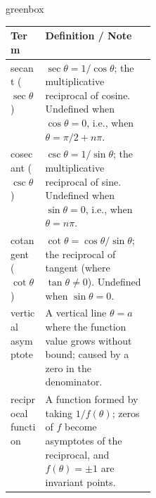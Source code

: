 \documentclass[10pt]{article}
\begin{document}
\begin{skillbox}{greenbox}
\begin{tabularx}{\linewidth}{@{} p{0.24\linewidth} X @{}}
\textbf{Term} & \textbf{Definition / Note} \\
\midrule
secant ($\sec\theta$) &
  $\sec\theta = 1/\cos\theta$; the multiplicative reciprocal of cosine.
  Undefined when $\cos\theta = 0$, i.e., when $\theta = \pi/2 + n\pi$. \\[4pt]
cosecant ($\csc\theta$) &
  $\csc\theta = 1/\sin\theta$; the multiplicative reciprocal of sine.
  Undefined when $\sin\theta = 0$, i.e., when $\theta = n\pi$. \\[4pt]
cotangent ($\cot\theta$) &
  $\cot\theta = \cos\theta/\sin\theta$; the reciprocal of tangent
  (where $\tan\theta \neq 0$).
  Undefined when $\sin\theta = 0$. \\[4pt]
vertical asymptote &
  A vertical line $\theta = a$ where the function value grows without
  bound; caused by a zero in the denominator. \\[4pt]
reciprocal function &
  A function formed by taking $1/f(\theta)$; zeros of $f$ become
  asymptotes of the reciprocal, and $f(\theta) = \pm 1$ are invariant
  points. \\
\end{tabularx}
\end{skillbox}

\vspace{0.08in}
\end{document}
